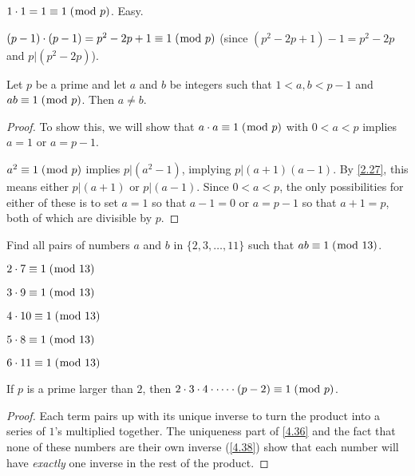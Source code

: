 \documentclass[../main.tex]{subfiles}
\begin{document}
$1 \cdot 1 = 1 \equiv 1 \; (\bmod \; p)$. Easy.

$(p-1) \cdot (p-1) = p^2 - 2p + 1 \equiv 1 \; (\bmod \; p)$ (since $(p^2 - 2p + 1) - 1 = p^2 - 2p$ and $p | (p^2 - 2p)$).



\begin{thm} \label{4.38}
  Let $p$ be a prime and let $a$ and $b$ be integers such that $1 < a, b < p - 1$ and $ab \equiv 1 \; (\bmod \; p)$. Then $a \not = b$.
\end{thm}

\begin{proof}
  To show this, we will show that $a \cdot a \equiv 1 \; (\bmod \; p)$ with $0 < a < p$ implies $a = 1$ or $a = p - 1$.

  $a^2 \equiv 1 \; (\bmod \; p)$ implies $p | (a^2 - 1)$, implying $p | (a+1)(a-1)$. By \ref{2.27}, this means either $p | (a+1)$ or $p | (a-1)$. Since $0 < a < p$, the only possibilities for either of these is to set $a = 1$ so that $a - 1 = 0$ or $a = p - 1$ so that $a + 1 = p$, both of which are divisible by $p$.
\end{proof}



\begin{ex} \label{4.39}
  Find all pairs of numbers $a$ and $b$ in $\{2, 3, \ldots, 11\}$ such that $ab \equiv 1 \; (\bmod \; 13)$.
\end{ex}

$2 \cdot 7 \equiv 1 \; (\bmod \; 13)$

$3 \cdot 9 \equiv 1 \; (\bmod \; 13)$

$4 \cdot 10 \equiv 1 \; (\bmod \; 13)$

$5 \cdot 8 \equiv 1 \; (\bmod \; 13)$

$6 \cdot 11 \equiv 1 \; (\bmod \; 13)$



\begin{thm} \label{4.40}
  If $p$ is a prime larger than $2$, then $2 \cdot 3 \cdot 4 \cdot \cdots \cdot (p-2) \equiv 1 \; (\bmod \; p)$.
\end{thm}

\begin{proof}
  Each term pairs up with its unique inverse to turn the product into a series of $1$'s multiplied together. The uniqueness part of \ref{4.36} and the fact that none of these numbers are their own inverse (\ref{4.38}) show that each number will have \emph{exactly} one inverse in the rest of the product.
\end{proof}
\end{document}
